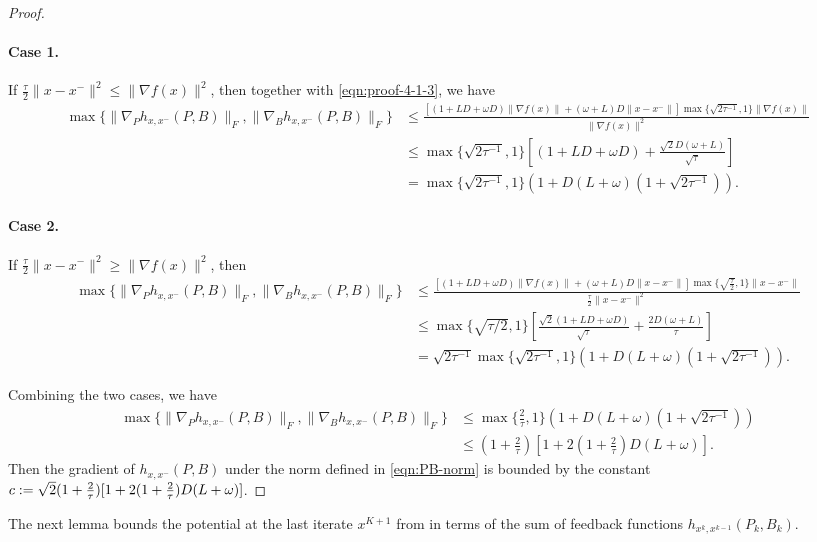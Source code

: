 \begin{proof}
\paragraph{Case 1.} If $\frac{\tau}{2} \| x - x^- \|^2 \leq \| \nabla f (x) \|^2$, then together with \eqref{eqn:proof-4-1-3}, we have
\begin{align*}
  \max \{ \|\nabla_P h_{x, x^{-}}(P, B)\|_F, \|\nabla_B h_{x, x^{-}}(P, B)\|_F \}  
  &\leq \tfrac{[(1 + LD + \omega D ) \|\nabla f(x)\| + (\omega + L) D \|x - x^{-}\|] \max\{ \sqrt{2\tau^{-1}}, 1\} \|\nabla f(x)\|}{\| \nabla f (x) \|^2} \\
  &\leq \max\{ \sqrt{2\tau^{-1}}, 1\} [(1 + LD + \omega D ) + \tfrac{\sqrt{2} D (\omega + L)}{\sqrt{\tau}}] \\
  &= \max\{ \sqrt{2\tau^{-1}}, 1\} (1 + D(L+\omega)(1+\sqrt{2\tau^{-1}})).
\end{align*}

\paragraph{Case 2.} If $\frac{\tau}{2} \| x - x^- \|^2 \geq \| \nabla f (x) \|^2$, then
\begin{align*}
  \max \{ \|\nabla_P h_{x, x^{-}}(P, B)\|_F, \|\nabla_B h_{x, x^{-}}(P, B)\|_F \}  
  &\leq \tfrac{[(1 + LD + \omega D ) \|\nabla f(x)\| + (\omega + L) D \|x - x^{-}\|] \max\{ \sqrt{\frac{\tau}{2}}, 1\} \|x - x^-\|}{\frac{\tau}{2}\|x - x^- \|^2} \\
  &\leq \max\{ \sqrt{\tau/2}, 1\}[\tfrac{ \sqrt{2} (1 + LD + \omega D )}{\sqrt{\tau}} + \tfrac{2 D (\omega + L)}{\tau}] \\
  &= \sqrt{2\tau^{-1}} \max\{ \sqrt{2\tau^{-1}}, 1\} (1 + D(L+\omega)(1+\sqrt{2\tau^{-1}})).
\end{align*}

Combining the two cases, we have
\begin{align*}
  \max \{ \|\nabla_P h_{x, x^{-}}(P, B)\|_F, \|\nabla_B h_{x, x^{-}}(P, B)\|_F \}  
  &\leq \max\{ \tfrac{2}{\tau}, 1\} (1 + D(L+\omega)(1+\sqrt{2\tau^{-1}})) \\
  &\leq (1+\tfrac{2}{\tau}) [1 + 2(1+\tfrac{2}{\tau}) D (L+\omega)].
\end{align*}
Then the gradient of $h_{x, x^{-}}(P, B)$ under the norm defined in \eqref{eqn:PB-norm} is bounded by the constant $c := \sqrt{2} (1+\tfrac{2}{\tau}) [1 + 2(1+\tfrac{2}{\tau}) D (L+\omega)]$.
\end{proof}

The next lemma bounds the potential at the last iterate $x^{K+1}$ from  in terms of the sum of feedback functions $h_{x^k, x^{k-1}}(P_k, B_k)$.

